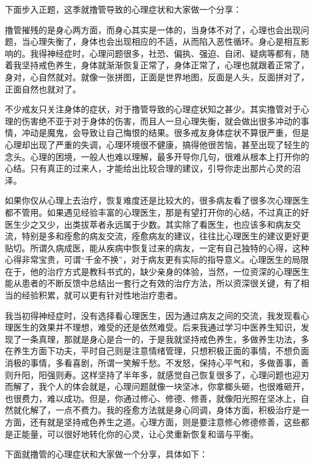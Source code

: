 \documentclass{ctexart}
\begin{document}
下面步入正题，这季就撸管导致的心理症状和大家做一个分享：

撸管摧残的是身心两方面，而身心其实是一体的，当身体不对了，心理也会出现问题，当心理失衡了，身体也会出现相应的不适，从而陷入恶性循环。身心是相互影响的。我得神经症时，心理问题很多，社恐、偏执、强迫、自闭、疑病等都有，随着我坚持戒色养生，身体就渐渐恢复正常了，身体正常了，心理也就跟着正常了，身对，心自然就对。就像一张拼图，正面是世界地图，反面是人头，反面拼对了，正面自然也就对了。

不少戒友只关注身体的症状，对于撸管导致的心理症状知之甚少。其实撸管对于心理的伤害绝不亚于对于身体的伤害，而且人一旦心理失衡，就会做出很多冲动的事情，冲动是魔鬼，会导致让自己悔恨的结果。很多戒友身体症状不算很严重，但是心理却出现了严重的失调，心理环境很不健康，搞得他很苦恼，甚至出现了轻生的念头。心理的困境，一般人也难以理解，最多开导你几句，很难从根本上打开你的心结。只有真正的过来人，才能给出比较合理的建议，引导你走出那片心灵的沼泽。

如果你仅从心理上去治疗，恢复难度还是比较大的，很多病友看了很多次心理医生都不管用。如果遇见经验丰富的心理医生，那是有望打开你的心结，不过真正的好医生少之又少，出类拔萃者永远属于少数。其实除了看医生，也应该多和病友交流，特别是多和痊愈的病友交流，痊愈病友的建议，往往比心理医生的建议更好更贴切。所谓久病成医，能从疾病中恢复过来的病友，一定有自己独特的心得，这种心得非常宝贵，可谓“千金不换”，对于病友更有实际的指导意义。心理医生的局限在于，他的治疗方式是教科书式的，缺少亲身的体验，当然，一位资深的心理医生能从患者的不断反馈中总结出一套行之有效的治疗方法，所以资深很关键，有了相当的经验积累，就可以更有针对性地治疗患者。

我当初得神经症时，没有选择看心理医生，因为通过病友之间的交流，我发现看心理医生的效果并不理想，难受的还是依然难受。后来我通过学习中医养生知识，发现了一条真理，那就是身心是合一的，于是我就坚持戒色养生，多做养生功法，多在养生方面下功夫，平时自己则是注意情绪管理，只想积极正面的事情，不想负面消极的事情，多看喜剧，所谓一笑解千愁。不发怒，保持心平气和，多做善事，善则升阳，阳强则寿。这样坚持了半年多，就感觉自己恢复很多了，心理问题也迎刃而解了，我个人的体会就是，心理问题就像一块坚冰，你拿榔头砸，也很难砸开，也很费力，难以成功。但是，你通过修心、修德、修善，就像阳光照在坚冰上，自然就化解了，一点不费力。我的痊愈方法就是身心同调，身体方面，积极治疗是一方面，还有就是坚持戒色养生之道。心理方面，则是要注意修心修德修善，这些都是正能量，可以很好地转化你的心灵，让心灵重新恢复和谐与平衡。

下面就撸管的心理症状和大家做一个分享，具体如下：
\end{document}
